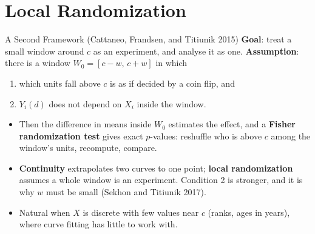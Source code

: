 \documentclass[aspectratio=169,11pt,xcolor=dvipsnames]{beamer}
\newcommand{\srcp}[1]{{\scriptsize\color{gray}(#1)}}
\begin{document}
\section[Local Rand.]{Local Randomization}
\begin{frame}\sectionpage\end{frame}

\begin{frame}{A Second Framework \srcp{Cattaneo, Frandsen, and Titiunik 2015}}
\textbf{Goal}: treat a small window around $c$ as an experiment, and analyse
it as one.
\vskip3pt
\textbf{Assumption}: there is a window $W_0 = [c - w,\, c + w]$ in which
\begin{enumerate}\itemsep1pt
  \item which units fall above $c$ is as if decided by a coin flip, and
  \item $Y_i(d)$ does not depend on $X_i$ inside the window.
\end{enumerate}
\vskip3pt
\begin{itemize}\itemsep3pt
  \item Then the difference in means inside $W_0$ estimates the effect, and a
        \textbf{Fisher randomization test} gives exact $p$-values:
        reshuffle who is above $c$ among the window's units, recompute, compare.
  \item \textbf{Continuity} extrapolates two curves to one point; \textbf{local
        randomization} assumes a whole window is an experiment. Condition 2 is
        stronger, and it is why $w$ must be small \srcp{Sekhon and Titiunik 2017}.
  \item Natural when $X$ is discrete with few values near $c$ (ranks, ages
        in years), where curve fitting has little to work with.
\end{itemize}
\end{frame}
\end{document}
